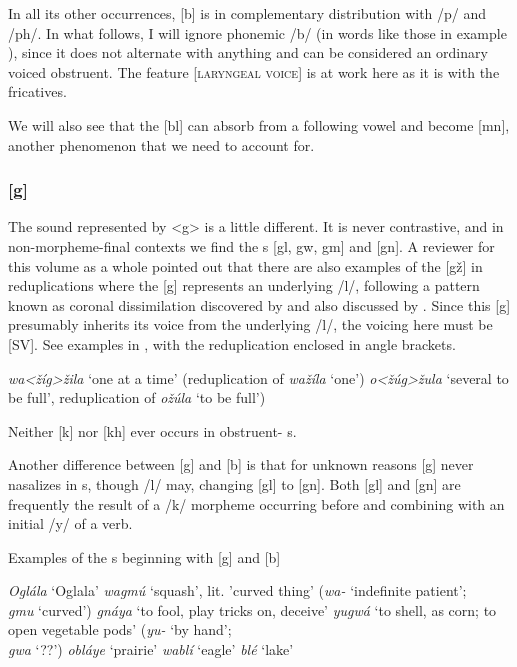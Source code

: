 \documentclass[output=paper]{LSP/langsci}
\begin{document}
In all its other occurrences, [b] is in complementary distribution with /p/ and /ph/. In what follows, I will ignore phonemic /b/ (in words like those in example ), since it does not alternate with anything and can be considered an ordinary voiced obstruent. The feature [\textsc{laryngeal voice}] is at work here as it is with the fricatives.

We will also see that the [bl]  can absorb  from a following vowel and become [mn], another phenomenon that we need to account for.

\subsubsection{[g]} 
\largerpage
The sound represented by <g> is a little different. It is never contrastive, and in non-morpheme-final contexts we find the s [gl, gw, gm] and [gn]. A reviewer for this volume as a whole pointed out that there are also examples of the  [g\v{z}] in reduplications where the [g] represents an underlying /l/, following a pattern known as coronal dissimilation discovered by \citet[225--226]{Carter1974} and also discussed by \citet[338]{Shaw1980}.  Since this [g] presumably inherits its voice from the underlying /l/, the voicing here must be [\textsc{SV}].  See examples in , with the reduplication enclosed in angle brackets.
 

\begin{exe}
\ex\label{ex:rood:2}
 \begin{xlist}
\ex \textit{wa<\v{z}íg>\v{z}ila} `one at a time' (reduplication of \textit{wa\v{z}íla} `one')
\ex \textit{o<\v{z}úg>\v{z}ula} `several to be full', reduplication of \textit{o\v{z}úla} `to be full')
\end{xlist}
\end{exe}

Neither [k] nor [kh] ever occurs in obstruent- s. 

Another difference between [g] and [b] is that for unknown reasons [g] never nasalizes in  s, though /l/ may, changing [gl] to [gn]. Both [gl] and [gn] are frequently the result of a /k/ morpheme occurring before and combining with an initial /y/ of a verb.

\begin{exe}
\ex \label{ex:rood:3}
Examples of the s beginning with [g] and [b]
\begin{xlist}
\ex \textit{Oglála} `Oglala'
\ex \textit{wagmú} `squash', lit. 'curved thing' (\textit{wa-} `indefinite patient'; \\	\textit{gmu} `curved')
\ex \textit{gnáya} `to fool, play tricks on, deceive'
\ex \textit{yugwá} `to shell, as corn; to open vegetable pods' (\textit{yu-} `by hand'; \\ \textit{gwa} `??')
\ex \textit{obláye} `prairie'
\ex \textit{wablí} `eagle'
\ex \textit{blé} `lake'
\end{xlist}
\end{exe}
\end{document}
